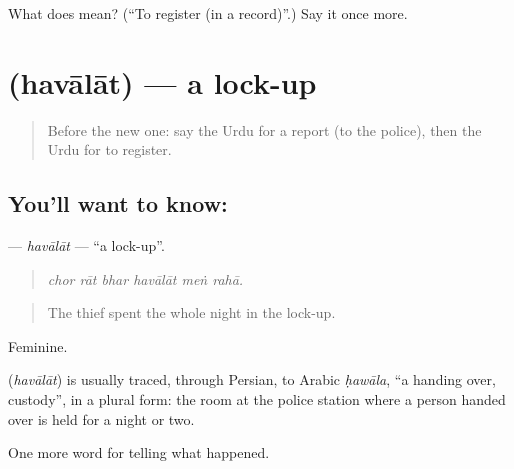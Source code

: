 \begin{tcolorbox}[breakable,colback=teal!4,colframe=teal!35!black,title={Before you move on}]
What does   mean? (\textquotedblleft{}To register (in a record)\textquotedblright{}.) Say it once more.
\end{tcolorbox}
\section[\texorpdfstring{\ur{حوالات} (havālāt)}{حوالات (havālāt)}]{ (havālāt) — a lock-up}

\label{lesson:UR-C278-havalat}



\begin{quote}
Before the new one: say the Urdu for a report (to the police), then the Urdu for to register.
\end{quote}

\subsection*{You'll want to know: }
\textbf{} — \emph{havālāt} — \textquotedblleft{}a lock-up\textquotedblright{}.

\begin{quote}
     
\end{quote}

\begin{quote}
\emph{chor rāt bhar havālāt meṅ rahā.}
\end{quote}

\begin{quote}
The thief spent the whole night in the lock-up.
\end{quote}

Feminine.

\begin{cousinweb}
\textbf{} (\emph{havālāt}) is usually traced, through Persian, to Arabic \emph{ḥawāla}, \textquotedblleft{}a handing over, custody\textquotedblright{}, in a plural form: the room at the police station where a person handed over is held for a night or two.
\end{cousinweb}

\begin{grammarlens}[title={What you've built}]
One more word for telling what happened.
\end{grammarlens}

